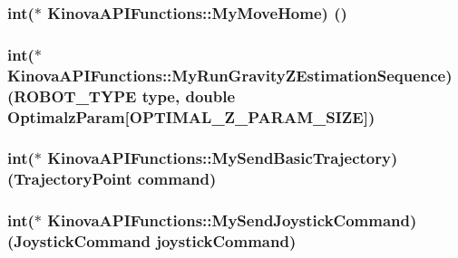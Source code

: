 \subsubsection[{\texorpdfstring{My\+Move\+Home}{MyMoveHome}}]{\setlength{\rightskip}{0pt plus 5cm}int($\ast$ Kinova\+A\+P\+I\+Functions\+::\+My\+Move\+Home) ()}\hypertarget{classKinovaAPIFunctions_a03c0a7192d27440be1cd544c7c6d3d06}{}\label{classKinovaAPIFunctions_a03c0a7192d27440be1cd544c7c6d3d06}
\subsubsection[{\texorpdfstring{My\+Run\+Gravity\+Z\+Estimation\+Sequence}{MyRunGravityZEstimationSequence}}]{\setlength{\rightskip}{0pt plus 5cm}int($\ast$ Kinova\+A\+P\+I\+Functions\+::\+My\+Run\+Gravity\+Z\+Estimation\+Sequence) (R\+O\+B\+O\+T\+\_\+\+T\+Y\+PE type, double Optimalz\+Param\mbox{[}O\+P\+T\+I\+M\+A\+L\+\_\+\+Z\+\_\+\+P\+A\+R\+A\+M\+\_\+\+S\+I\+ZE\mbox{]})}\hypertarget{classKinovaAPIFunctions_a93a9e5fd28e1a49350f02494cb7bd0f7}{}\label{classKinovaAPIFunctions_a93a9e5fd28e1a49350f02494cb7bd0f7}
\subsubsection[{\texorpdfstring{My\+Send\+Basic\+Trajectory}{MySendBasicTrajectory}}]{\setlength{\rightskip}{0pt plus 5cm}int($\ast$ Kinova\+A\+P\+I\+Functions\+::\+My\+Send\+Basic\+Trajectory) (Trajectory\+Point command)}\hypertarget{classKinovaAPIFunctions_a46a88767727e276d53fa65021122e095}{}\label{classKinovaAPIFunctions_a46a88767727e276d53fa65021122e095}
\subsubsection[{\texorpdfstring{My\+Send\+Joystick\+Command}{MySendJoystickCommand}}]{\setlength{\rightskip}{0pt plus 5cm}int($\ast$ Kinova\+A\+P\+I\+Functions\+::\+My\+Send\+Joystick\+Command) (Joystick\+Command joystick\+Command)}\hypertarget{classKinovaAPIFunctions_a83ca7834bb9b9eb003b1925603f1778c}{}\label{classKinovaAPIFunctions_a83ca7834bb9b9eb003b1925603f1778c}
